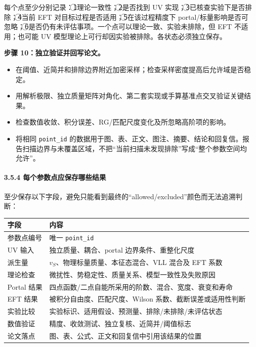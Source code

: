 \documentclass[
  chinese,
  UTF8]{ctexart}
\newcounter{none} %
\providecommand{\tightlist}{%
  \setlength{\itemsep}{0pt}\setlength{\parskip}{0pt}}
\begin{document}
每个点至少分别记录：\textcircled{1}理论一致性；\textcircled{2}是否找到
UV 实现；\textcircled{3}已核查实验下是否排除；\textcircled{4}当前 EFT
对目标过程是否适用；\textcircled{5}在该过程精度下
portal/标量影响是否可忽略；\textcircled{6}是否仍有未评估事项。一个点可以理论一致、实验未排除，但
EFT 不适用；也可能 UV 模型理论上可行却因实验被排除。各状态必须独立保存。

\textbf{步骤 10：独立验证并回写论文。}

\begin{itemize}
\tightlist
\item
  在阈值、近简并和排除边界附近加密采样；检查采样密度提高后允许域是否稳定。
\item
  用解析极限、独立质量矩阵对角化、第二套实现或手算基准点交叉验证关键结果。
\item
  检查数值收敛、积分误差、RG/匹配尺度变化及所忽略高阶项的影响。
\item
  将相同 \texttt{point\_id}
  的数据用于图、表、正文、图注、摘要、结论和回复信。报告扫描边界与未覆盖区域，不把``当前扫描未发现排除''写成``整个参数空间均允许''。
\end{itemize}

\paragraph{3.5.4
每个参数点应保存哪些结果}\label{ux6bcfux4e2aux53c2ux6570ux70b9ux5e94ux4fddux5b58ux54eaux4e9bux7ed3ux679c}

至少保存以下字段，避免只能看到最终的``allowed/excluded''颜色而无法追溯判断：

{\def\LTcaptype{none} %
\begin{longtable}[]{@{}ll@{}}
\toprule\noalign{}
字段 & 内容 \\
\midrule\noalign{}
\endhead
\bottomrule\noalign{}
\endlastfoot
参数点编号 & 唯一 \texttt{point\_id} \\
UV 输入 & 独立质量、耦合、portal 边界条件、重整化尺度 \\
派生量 & \(v_S\)、物理标量质量、本征态混合、VLL 混合及 EFT 系数 \\
理论检查 & 微扰性、势稳定性、质量关系、模型一致性及失败原因 \\
Portal 结果 & 四点函数/二点自能所采用的阶数、混合、宽度、衰变和寿命 \\
EFT 结果 & 被积分自由度、匹配尺度、Wilson 系数、截断误差或适用性判断 \\
实验比较 & 实验标识、适用假设、预测量、排除/未排除/未评估状态 \\
数值验证 & 精度、收敛测试、独立复核、近简并/阈值标志 \\
论文落点 & 图、表、公式、正文和回复信中引用该结果的位置 \\
\end{longtable}
}
\end{document}

